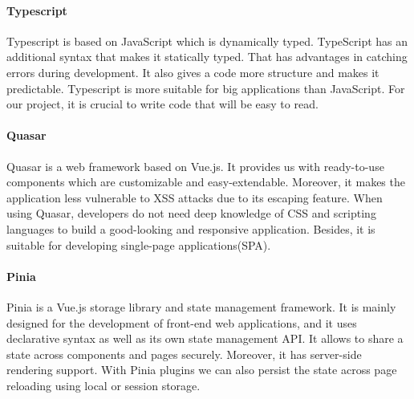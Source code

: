 \paragraph*{Typescript} Typescript is based on JavaScript which is dynamically typed. TypeScript has an additional syntax that makes it statically typed. That has advantages in catching errors during development. It also gives a code more structure and makes it predictable. Typescript is more suitable for big applications than JavaScript. For our project, it is crucial to write code that will be easy to read.\cite{typescript-doc}

\paragraph*{Quasar} Quasar is a web framework based on Vue.js. It provides us with ready-to-use components which are customizable and easy-extendable. Moreover, it makes the application less vulnerable to XSS attacks due to its escaping feature. When using Quasar, developers do not need deep knowledge of CSS and scripting languages to build a good-looking  and responsive application. Besides, it is suitable for developing single-page applications(SPA).\cite{quasar-doc}

\paragraph*{Pinia} Pinia is a Vue.js storage library and state management framework. It is mainly designed for the development of front-end web applications, and it uses declarative syntax as well as its own state management API.
It allows to share a state across components and pages securely. Moreover, it has server-side rendering support. With Pinia plugins we can also persist the state across page reloading using local or session storage.\cite{pinia-wiki}

